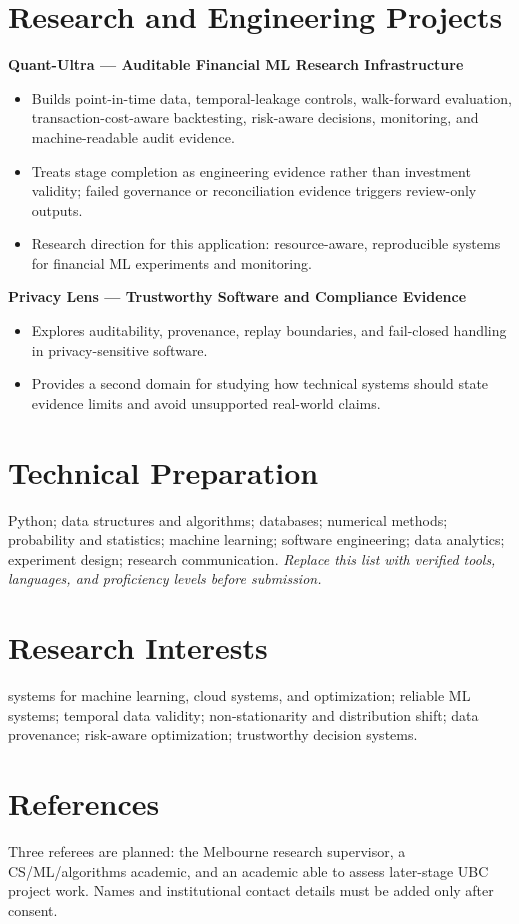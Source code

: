 \documentclass[11pt]{article}
\begin{document}
\section*{Research and Engineering Projects}
\textbf{Quant-Ultra --- Auditable Financial ML Research Infrastructure}
\begin{itemize}
\item Builds point-in-time data, temporal-leakage controls, walk-forward evaluation, transaction-cost-aware backtesting, risk-aware decisions, monitoring, and machine-readable audit evidence.
\item Treats stage completion as engineering evidence rather than investment validity; failed governance or reconciliation evidence triggers review-only outputs.
\item Research direction for this application: resource-aware, reproducible systems for financial ML experiments and monitoring.
\end{itemize}

\begin{samepage}
\textbf{Privacy Lens --- Trustworthy Software and Compliance Evidence}
\begin{itemize}
\item Explores auditability, provenance, replay boundaries, and fail-closed handling in privacy-sensitive software.
\item Provides a second domain for studying how technical systems should state evidence limits and avoid unsupported real-world claims.
\end{itemize}
\end{samepage}

\section*{Technical Preparation}
Python; data structures and algorithms; databases; numerical methods; probability and statistics; machine learning; software engineering; data analytics; experiment design; research communication. \textit{Replace this list with verified tools, languages, and proficiency levels before submission.}

\section*{Research Interests}
systems for machine learning, cloud systems, and optimization; reliable ML systems; temporal data validity; non-stationarity and distribution shift; data provenance; risk-aware optimization; trustworthy decision systems.

\section*{References}
Three referees are planned: the Melbourne research supervisor, a CS/ML/algorithms academic, and an academic able to assess later-stage UBC project work. Names and institutional contact details must be added only after consent.
\end{document}
